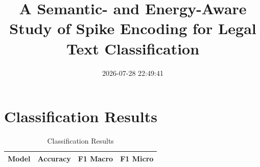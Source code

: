 \documentclass[12pt]{article}
\title{A Semantic- and Energy-Aware Study of Spike Encoding for Legal Text Classification}
\date{2026-07-28 22:49:41}
\begin{document}
\maketitle
\section{Classification Results}
\begin{table}[h]\centering
\begin{tabular}{lccc}\toprule
Model & Accuracy & F1 Macro & F1 Micro \\\midrule
\bottomrule\end{tabular}
\caption{Classification Results}
\end{table}
\end{document}
